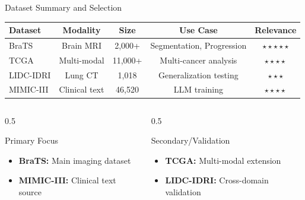 \documentclass[aspectratio=169]{beamer}
\begin{document}
\begin{frame}{Dataset Summary and Selection}
    \begin{center}
        \begin{tabular}{@{}lcccc@{}}
            \toprule
            \textbf{Dataset} & \textbf{Modality} & \textbf{Size} & \textbf{Use Case} & \textbf{Relevance} \\
            \midrule
            BraTS & Brain MRI & 2,000+ & Segmentation, Progression & $\star\star\star\star\star$ \\
            TCGA & Multi-modal & 11,000+ & Multi-cancer analysis & $\star\star\star\star$ \\
            LIDC-IDRI & Lung CT & 1,018 & Generalization testing & $\star\star\star$ \\
            MIMIC-III & Clinical text & 46,520 & LLM training & $\star\star\star\star$ \\
            \bottomrule
        \end{tabular}
    \end{center}
    
    \vspace{1em}
    
    \begin{columns}
        \begin{column}{0.5\textwidth}
            \begin{block}{Primary Focus}
                \begin{itemize}
                    \item \textbf{BraTS:} Main imaging dataset
                    \item \textbf{MIMIC-III:} Clinical text source
                \end{itemize}
            \end{block}
        \end{column}
        \begin{column}{0.5\textwidth}
            \begin{block}{Secondary/Validation}
                \begin{itemize}
                    \item \textbf{TCGA:} Multi-modal extension
                    \item \textbf{LIDC-IDRI:} Cross-domain validation
                \end{itemize}
            \end{block}
        \end{column}
    \end{columns}
\end{frame}
\end{document}

